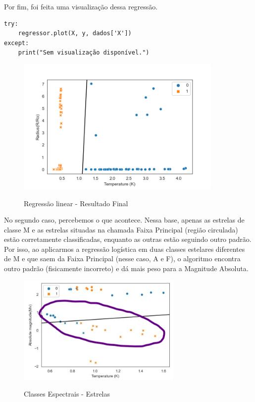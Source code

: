 \documentclass[12pt]{article}
\begin{document}
Por fim, foi feita uma visualização dessa regressão.
\\
\begin{lstlisting}
try:
    regressor.plot(X, y, dados['X'])
except:
    print("Sem visualização disponível.")
\end{lstlisting}

\begin{figure}[h]
\caption{Regressão linear - Resultado Final}
\centering
\includegraphics[width=10cm]{teste.png}
\label{figura:regressao_linear}
\end{figure}

\hspace{0.4cm}No segundo caso, percebemos o que acontece. Nessa base, apenas as estrelas de classe M e as estrelas situadas na chamada Faixa Principal (região circulada) estão corretamente classificadas, enquanto as outras estão seguindo outro padrão. Por isso, ao aplicarmos a regressão logística em duas classes estelares diferentes de M e que saem da Faixa Principal (nesse caso, A e F), o algoritmo encontra outro padrão (fisicamente incorreto) e dá mais peso para a Magnitude Absoluta.

\begin{figure}[h]
    \caption{Classes Espectrais - Estrelas}
    \centering
    \includegraphics[width=8cm]{out7.png}
    \label{figura:out7}
\end{figure}
\end{document}
